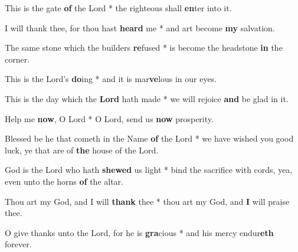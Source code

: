 \begin{multicols}{2}
	This is the gate \textbf{of} the Lord * the righteous shall \textbf{en}ter into it.
	
	I will thank thee, for thou hast \textbf{heard} me * and art become \textbf{my} salvation.
	
	The same stone which the builders \textbf{re}fused * is become the headstone \textbf{in} the corner.
	
	This is the Lord's \textbf{do}ing * and it is mar\textbf{ve}lous in our eyes.
	
	This is the day which the \textbf{Lord} hath made * we will rejoice \textbf{and} be glad in it.
	
	Help me \textbf{now}, O Lord * O Lord, send us \textbf{now} prosperity.
	
	Blessed be he that cometh in the Name \textbf{of} the Lord * we have wished you good luck, ye that are of \textbf{the} house of the Lord.
	
	God is the Lord who hath \textbf{shewed} us light * bind the sacrifice with cords, yea, even unto the horns \textbf{of} the altar.
	
	Thou art my God, and I will \textbf{thank} thee * thou art my God, and \textbf{I} will praise thee.
	
	O give thanks unto the Lord, for he is \textbf{gra}cious * and his mercy endur\textbf{eth} forever.
\end{multicols}